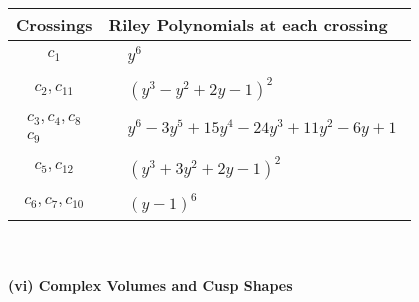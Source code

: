 \documentclass[1p]{elsarticle_modified}
\theoremstyle{definition}
\begin{document}
\begin{tabular}{m{50pt}|m{274pt}}
Crossings & \hspace{64pt}Riley Polynomials at each crossing \\
\hline $$\begin{aligned}c_{1}\end{aligned}$$&$\begin{aligned}
&y^6
\end{aligned}$\\
\hline $$\begin{aligned}c_{2},c_{11}\end{aligned}$$&$\begin{aligned}
&(y^3- y^2+2 y-1)^2
\end{aligned}$\\
\hline $$\begin{aligned}c_{3},c_{4},c_{8}\\c_{9}\end{aligned}$$&$\begin{aligned}
&y^6-3 y^5+15 y^4-24 y^3+11 y^2-6 y+1
\end{aligned}$\\
\hline $$\begin{aligned}c_{5},c_{12}\end{aligned}$$&$\begin{aligned}
&(y^3+3 y^2+2 y-1)^2
\end{aligned}$\\
\hline $$\begin{aligned}c_{6},c_{7},c_{10}\end{aligned}$$&$\begin{aligned}
&(y-1)^6
\end{aligned}$\\
\hline
\end{tabular}\\~\\
\newpage\flushleft \textbf{(vi) Complex Volumes and Cusp Shapes}
\end{document}
